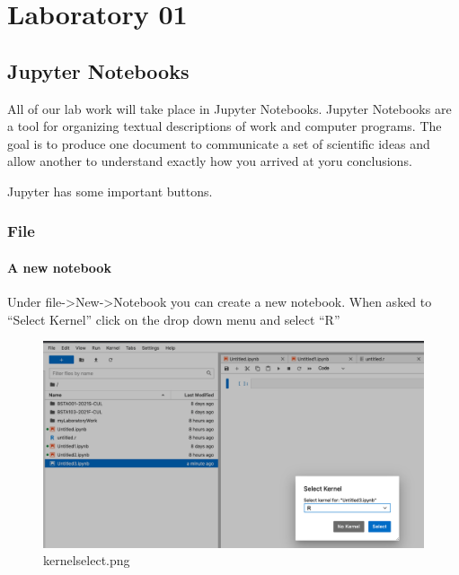 

\chapter{Laboratory 01}
\hspace{1mm}
    \hypertarget{jupyter-notebooks}{%
\section{Jupyter Notebooks}\label{jupyter-notebooks}}

All of our lab work will take place in Jupyter Notebooks. Jupyter
Notebooks are a tool for organizing textual descriptions of work and
computer programs. The goal is to produce one document to communicate a
set of scientific ideas and allow another to understand exactly how you
arrived at yoru conclusions.

Jupyter has some important buttons.

\hypertarget{file}{%
\subsection{File}\label{file}}

\hypertarget{a-new-notebook}{%
\subsubsection{A new notebook}\label{a-new-notebook}}

Under file-\textgreater New-\textgreater Notebook you can create a new
notebook. When asked to ``Select Kernel'' click on the drop down menu
and select ``R''

\begin{figure}
\centering
\includegraphics{chapters/chapter1/kernelselect}
\caption{kernelselect.png}
\end{figure}

